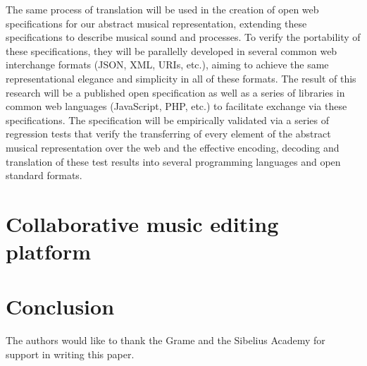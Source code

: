 \documentclass{article}
\begin{document}
The same process of translation will be used in the
creation of open web specifications for our abstract musical representation,
extending these specifications to describe musical sound and processes. To verify
the portability of these specifications, they will be parallelly
developed in several common web interchange formats (JSON, XML, URIs, etc.),
aiming to achieve the same representational elegance and simplicity in all
of these formats. The result of this research will be a published open
specification as well as a series of libraries in common web languages
(JavaScript, PHP, etc.) to facilitate exchange via these specifications. The
specification will be empirically validated via a series of regression tests that
verify the transferring of every element of the abstract musical
representation over the web and the effective encoding, decoding and
translation of these test results into several programming languages and
open standard formats.


\section{Collaborative music editing platform}\label{sec:collaborative-music-editing-platform}
\section{Conclusion}\label{sec:conclusion}
\begin{acknowledgments}
The authors would like to thank the Grame and the Sibelius Academy for
support in writing this paper.
\end{acknowledgments} 


\end{document}
